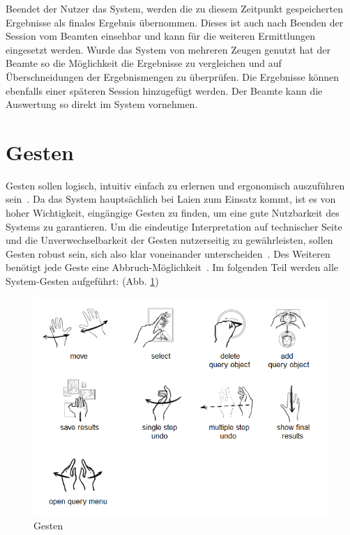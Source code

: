 \documentclass{sigchi-ext}
\begin{document}
Beendet der Nutzer das System, werden die zu diesem Zeitpunkt gespeicherten Ergebnisse als finales Ergebnis übernommen. Dieses ist auch nach Beenden der Session vom Beamten einsehbar und kann für die weiteren Ermittlungen eingesetzt werden. Wurde das System von mehreren Zeugen genutzt hat der Beamte so die Möglichkeit die Ergebnisse zu vergleichen und auf Überschneidungen der Ergebnismengen zu überprüfen. Die Ergebnisse können ebenfalls einer späteren Session hinzugefügt werden. Der Beamte kann die Auswertung so direkt im System vornehmen.

\section{Gesten}
Gesten sollen logisch, intuitiv einfach zu erlernen und ergonomisch auszuführen sein~\cite{3dinteraction:book}. 
Da das System hauptsächlich bei Laien zum Einsatz kommt, ist es von hoher Wichtigkeit, eingängige Gesten zu finden, um eine gute Nutzbarkeit des Systems zu garantieren.
Um die eindeutige Interpretation auf technischer Seite und die Unverwechselbarkeit der Gesten nutzerseitig zu gewährleisten, sollen Gesten robust sein, sich also klar voneinander unterscheiden~\cite{3dinteraction:book,Dorau11}.
Des Weiteren benötigt jede Geste eine Abbruch-Möglichkeit~\cite{Dorau11}. Im folgenden Teil werden alle System-Gesten aufgeführt: (Abb. \ref{fig:gestures})

\begin{figure}
  \centering
  \includegraphics[width=1.8\marginparwidth]{figures/gestures.png}
  \caption{Gesten}
  \label{fig:gestures}
\end{figure}
\end{document}

